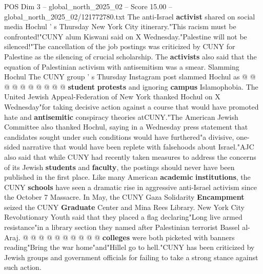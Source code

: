 \begin{textsample}{POS Dim 3 – global\_north\_2025\_02 – Score 15.00 – global\_north\_2025\_02/121772780.txt}
The anti-Israel \textbf{activist} shared on social media Hochul ' s Thursday New York City itinerary."This racism must be confronted!"CUNY alum Kiswani said on X Wednesday."Palestine will not be silenced!"The cancellation of the job postings was criticized by CUNY for Palestine as the silencing of crucial scholarship.
The \textbf{activists} also said that the equation of Palestinian activism with antisemitism was a smear.
Slamming Hochul The CUNY group ' s Thursday Instagram post slammed Hochul as @ @ @ @ @ @ @ @ @ @ \textbf{student} \textbf{protests} and ignoring \textbf{campus} Islamophobia.
The United Jewish Appeal-Federation of New York thanked Hochul on X Wednesday"for taking decisive action against a course that would have promoted hate and \textbf{antisemitic} conspiracy theories atCUNY."The American Jewish Committee also thanked Hochul, saying in a Wednesday press statement that candidates sought under such conditions would have furthered"a divisive, one-sided narrative that would have been replete with falsehoods about Israel."AJC also said that while CUNY had recently taken measures to address the concerns of its Jewish \textbf{students} and \textbf{faculty}, the postings should never have been published in the first place.
Like many American \textbf{academic} \textbf{institutions}, the CUNY \textbf{schools} have seen a dramatic rise in aggressive anti-Israel activism since the October 7 Massacre.
In May, the CUNY Gaza Solidarity \textbf{Encampment} seized the CUNY \textbf{Graduate} Center and Mina Rees Library.
New York City Revolutionary Youth said that they placed a flag declaring"Long live armed resistance"in a library section they named after Palestinian terrorist Bassel al-Araj. @ @ @ @ @ @ @ @ @ @ \textbf{colleges} were both picketed with banners reading"Bring the war home"and"Hillel go to hell."CUNY has been criticized by Jewish groups and government officials for failing to take a strong stance against such action.

\end{textsample}
